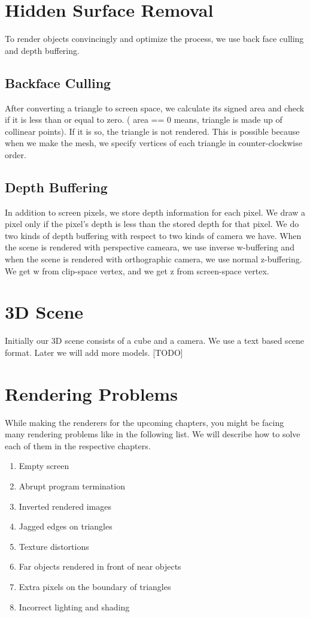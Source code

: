\section{Hidden Surface Removal}
To render objects convincingly and optimize the process, we use back face culling and depth buffering.
\subsection{Backface Culling}
After converting a triangle to screen space, we calculate its signed area and check if it is less than or equal to zero. ( area == 0 means, triangle is made up of collinear points). If it is so, the triangle is not rendered. This is possible because when we make the mesh, we specify vertices of each triangle in counter-clockwise order.
\subsection{Depth Buffering}
In addition to screen pixels, we store depth information for each pixel.
We draw a pixel only if the pixel's depth is less than the stored depth for that pixel. We do two kinds of depth buffering with respect to two kinds of camera we have. When the scene is rendered with perspective cameara, we use inverse w-buffering and when the scene is rendered with orthographic camera, we use normal z-buffering.
We get w from clip-space vertex, and we get z from screen-space vertex. 

\section{3D Scene}
Initially our 3D scene consists of a cube and a camera. We use a text based scene format. Later we will add more models.  [TODO]
\section{Rendering Problems}
While making the renderers for the upcoming chapters, you might be facing many rendering problems like in the following list. We will describe how to solve each of them in the respective chapters.
\vspace{1em} 
\begin{enumerate}
	\item Empty screen
    \item Abrupt program termination 
    \item Inverted rendered images
    \item Jagged edges on triangles
    \item Texture distortions
    \item Far objects rendered in front of near objects
    \item Extra pixels on the boundary of triangles
    \item Incorrect lighting and shading
\end{enumerate}
\vspace{1em} 

\clearpage
